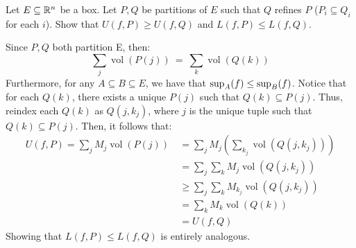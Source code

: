 \documentclass{article}
\DeclareMathOperator{\vol}{vol}
\begin{document}
\setcounter{subsection}{12}
\setcounter{exr}{12}

\begin{exr}
    Let $ E \subseteq \mathbb{R}^{n} $ be a box. Let $ P, Q $ be partitions of $ E $ such that $ Q $
    refines $ P $ ($ P_{i} \subseteq Q_{i} $ for each $ i $). \vsp
    Show that $ U(f,P) \geq U(f,Q) $ and $ L(f,P) \leq L(f,Q) $.
\end{exr}

\begin{pf}
    Since $ P, Q $ both partition E, then:
    \begin{equation*}
        \sum_{j}\vol(P(j)) \ = \ \sum_{k}\vol(Q(k))
    \end{equation*}
    Furthermore, for any $ A \subseteq B \subseteq E $, we have that $ \textrm{sup}_{A}(f) \leq
    \textrm{sup}_{B}(f) $. Notice that for each $ Q(k) $, there exists a unique $ P(j) $ such that
    $ Q(k) \subseteq P(j) $. \vsp
    Thus, reindex each $ Q(k) $ as $ Q(j, k_{j}) $, where $ j $ is the unique tuple such that
    $ Q(k) \subseteq P(j) $. Then, it follows that:
    \begin{align*}
        U(f, P) = \sum_{j}M_{j}\vol(P(j)) & \ = \sum_{j}M_{j} \left( \sum_{k_{j}}
        \vol(Q(j, k_{j})) \right) \\
                                          & \ = \sum_{j}\sum_{k}M_{j}\vol(Q(j,k_{j})) \\
                                          & \ \geq \sum_{j}\sum_{k}M_{k_{j}}\vol(Q(j,k_{j})) \\
                                          & \ = \sum_{k}M_{k}\vol(Q(k)) \\
                                          & \ = U(f, Q)
    \end{align*}
    Showing that $ L(f,P) \leq L(f, Q) $ is entirely analogous.
\end{pf}
\end{document}
